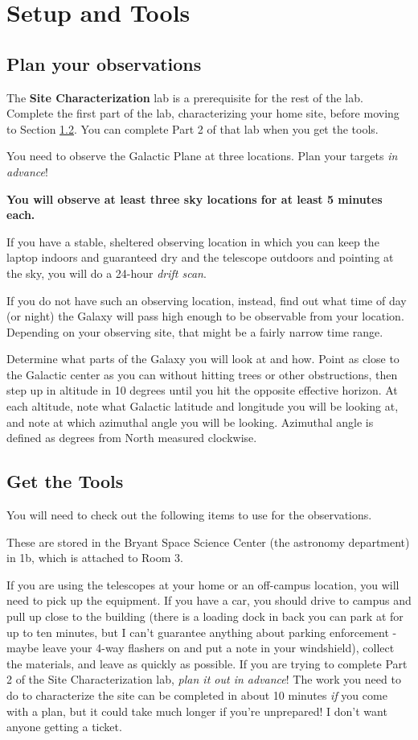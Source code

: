 \documentclass[11pt]{article}
\begin{document}
\section{Setup and Tools}
\label{sec:tools}

\subsection{Plan your observations}
The \textbf{Site Characterization} lab is a prerequisite for the rest of the lab.
Complete the first part of the lab, characterizing your home site,
before moving to Section \ref{sec:gettingthetools}.
You can complete Part 2 of that lab when you get the tools.

You need to observe the Galactic Plane at three locations.
Plan your targets \emph{in advance}!

\textbf{You will observe at least three sky locations for at least 5 minutes each.}

If you have a stable, sheltered observing location in which you can keep
the laptop indoors and guaranteed dry and the telescope outdoors and pointing
at the sky, you will do a 24-hour \emph{drift scan}.

If you do not have such an observing location, instead, find out what
time of day (or night) the Galaxy will pass high enough to be observable
from your location.  Depending on your observing site, that might be
a fairly narrow time range.

Determine what parts of the Galaxy you will look at and how.
Point as close to the Galactic center as you can without hitting trees
or other obstructions, then step up in altitude in 10 degrees until you hit the opposite
effective horizon.  At each altitude, note what Galactic latitude and
longitude you will be looking at, and note at which azimuthal angle you will be
looking.  Azimuthal angle is defined as degrees from North measured clockwise.


\clearpage
\subsection{Get the Tools}
\label{sec:gettingthetools}
You will need to check out the following items to use for the observations.

These are stored in the Bryant Space Science Center (the astronomy department) in 1b, which
is attached to Room 3.

If you are using the telescopes at your home or an off-campus location, you will need to pick up
the equipment.
If you have a car, you should drive to campus and pull up close to the building
(there is a loading dock in back you can park at for up to ten minutes, but I can't guarantee
anything about parking enforcement - maybe leave your 4-way flashers on and put a note in your windshield),
collect the materials, and leave as quickly as possible.
If you are trying to complete Part 2 of the Site Characterization lab, \emph{plan it out in advance}!
The work you need to do to characterize the site can be completed in about 10 minutes \emph{if}
you come with a plan, but it could take much longer if you're unprepared!  I don't want anyone getting a ticket.
\end{document}
